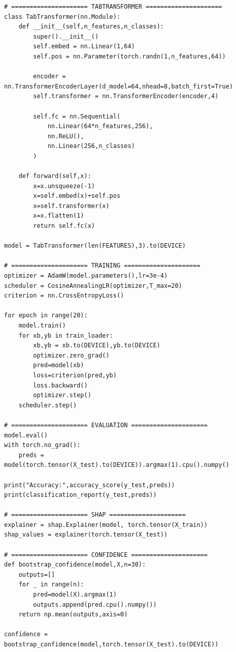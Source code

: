 \documentclass[12pt,a4paper]{report}
\numberwithin{table}{chapter}
\numberwithin{figure}{chapter}
\begin{document}
\begin{verbatim}
# ===================== TABTRANSFORMER =====================
class TabTransformer(nn.Module):
    def __init__(self,n_features,n_classes):
        super().__init__()
        self.embed = nn.Linear(1,64)
        self.pos = nn.Parameter(torch.randn(1,n_features,64))

        encoder = nn.TransformerEncoderLayer(d_model=64,nhead=8,batch_first=True)
        self.transformer = nn.TransformerEncoder(encoder,4)

        self.fc = nn.Sequential(
            nn.Linear(64*n_features,256),
            nn.ReLU(),
            nn.Linear(256,n_classes)
        )

    def forward(self,x):
        x=x.unsqueeze(-1)
        x=self.embed(x)+self.pos
        x=self.transformer(x)
        x=x.flatten(1)
        return self.fc(x)

model = TabTransformer(len(FEATURES),3).to(DEVICE)

# ===================== TRAINING =====================
optimizer = AdamW(model.parameters(),lr=3e-4)
scheduler = CosineAnnealingLR(optimizer,T_max=20)
criterion = nn.CrossEntropyLoss()

for epoch in range(20):
    model.train()
    for xb,yb in train_loader:
        xb,yb = xb.to(DEVICE),yb.to(DEVICE)
        optimizer.zero_grad()
        pred=model(xb)
        loss=criterion(pred,yb)
        loss.backward()
        optimizer.step()
    scheduler.step()

# ===================== EVALUATION =====================
model.eval()
with torch.no_grad():
    preds = model(torch.tensor(X_test).to(DEVICE)).argmax(1).cpu().numpy()

print("Accuracy:",accuracy_score(y_test,preds))
print(classification_report(y_test,preds))

# ===================== SHAP =====================
explainer = shap.Explainer(model, torch.tensor(X_train))
shap_values = explainer(torch.tensor(X_test))

# ===================== CONFIDENCE =====================
def bootstrap_confidence(model,X,n=30):
    outputs=[]
    for _ in range(n):
        pred=model(X).argmax(1)
        outputs.append(pred.cpu().numpy())
    return np.mean(outputs,axis=0)

confidence = bootstrap_confidence(model,torch.tensor(X_test).to(DEVICE))
\end{verbatim}

\end{document}
